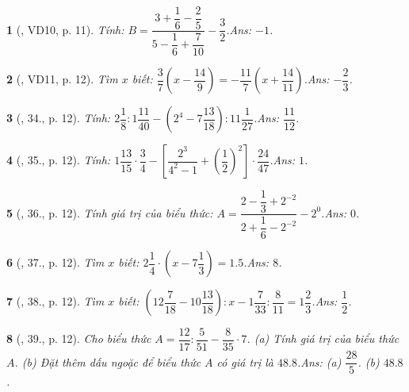 \documentclass{article}
\newtheorem{baitoan}{}
\begin{document}
\begin{baitoan}[\cite{Tuyen_Toan_7}, VD10, p. 11]
	Tính: $B = \dfrac{3 + \dfrac{1}{6} - \dfrac{2}{5}}{5 - \dfrac{1}{6} + \dfrac{7}{10}} - \dfrac{3}{2}$.\hfill{\sf Ans: $-1$.}
\end{baitoan}

\begin{baitoan}[\cite{Tuyen_Toan_7}, VD11, p. 12]
	Tìm $x$ biết: $\dfrac{3}{7}\left(x - \dfrac{14}{9}\right) = -\dfrac{11}{7}\left(x + \dfrac{14}{11}\right)$.\hfill{\sf Ans: $-\dfrac{2}{3}$.}
\end{baitoan}

\begin{baitoan}[\cite{Tuyen_Toan_7}, 34., p. 12]
	Tính: $2\dfrac{1}{8}:1\dfrac{11}{40} - \left(2^4 - 7\dfrac{13}{18}\right):11\dfrac{1}{27}$.\hfill{\sf Ans: $\dfrac{11}{12}$.}
\end{baitoan}

\begin{baitoan}[\cite{Tuyen_Toan_7}, 35., p. 12]
	Tính: $1\dfrac{13}{15}\cdot\dfrac{3}{4} - \left[\dfrac{2^3}{4^2 - 1} + \left(\dfrac{1}{2}\right)^2\right]\cdot\dfrac{24}{47}$.\hfill{\sf Ans: $1$.}
\end{baitoan}

\begin{baitoan}[\cite{Tuyen_Toan_7}, 36., p. 12]
	Tính giá trị của biểu thức: $A = \dfrac{2 - \dfrac{1}{3} + 2^{-2}}{2 + \dfrac{1}{6} - 2^{-2}} - 2^0$.\hfill{\sf Ans: $0$.}
\end{baitoan}

\begin{baitoan}[\cite{Tuyen_Toan_7}, 37., p. 12]
	Tìm $x$ biết: $2\dfrac{1}{4}\cdot\left(x - 7\dfrac{1}{3}\right) = 1.5$.\hfill{\sf Ans: $8$.}
\end{baitoan}

\begin{baitoan}[\cite{Tuyen_Toan_7}, 38., p. 12]
	Tìm $x$ biết: $\left(12\dfrac{7}{18} - 10\dfrac{13}{18}\right):x - 1\dfrac{7}{33}:\dfrac{8}{11} = 1\dfrac{2}{3}$.\hfill{\sf Ans: $\dfrac{1}{2}$.}
\end{baitoan}

\begin{baitoan}[\cite{Tuyen_Toan_7}, 39., p. 12]
	Cho biểu thức $A = \dfrac{12}{17}:\dfrac{5}{51} - \dfrac{8}{35}\cdot 7$. (a) Tính giá trị của biểu thức $A$. (b) Đặt thêm dấu ngoặc để biểu thức $A$ có giá trị là $48.8$.\hfill{\sf Ans: (a) $\dfrac{28}{5}$. (b) $48.8$.}
\end{baitoan}
\end{document}

